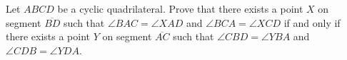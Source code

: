 Let $ABCD$ be a cyclic quadrilateral.  Prove that there exists a point $X$ on segment $\overline{BD}$ such that $\angle BAC=\angle XAD$ and $\angle BCA=\angle XCD$ if and only if there exists a point $Y$ on segment $\overline{AC}$ such that $\angle CBD=\angle YBA$ and $\angle CDB=\angle YDA$.
